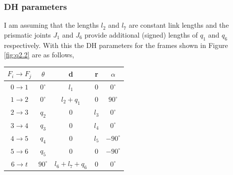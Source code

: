 \documentclass[12pt]{article}
\begin{document}
\subsubsection*{DH parameters}
I am assuming that the lengths $l_2$ and $l_7$ are constant link lengths and the prismatic joints $J_1$ and $J_6$ provide additional (signed) lengths of $q_1$ and $q_6$ respectively.
With this the DH parameters for the frames shown in Figure \ref{fig:q2.2} are as follows,
\begin{center}
\begin{tabular}{ c | c c c c }
 \hline
 $F_i \to F_j$ & $\theta$ & d & r & $\alpha$ \\
 \hline
 $0 \to 1$ & $0^{\circ}$    & $l_1$                      & $0$     &   $0^{\circ}$   \\
 $1 \to 2$ & $0^{\circ}$    & $l_2 + q_1$                & $0$     &   $90^{\circ}$  \\
 $2 \to 3$ & $q_2$          & $0$                        & $l_3$   &   $0^{\circ}$   \\
 $3 \to 4$ & $q_3$          & $0$                        & $l_4$   &   $0^{\circ}$   \\
 $4 \to 5$ & $q_4$          & $0$                        & $l_5$   &   $-90^{\circ}$ \\
 $5 \to 6$ & $q_5$          & $0$                        & $0$     &   $-90^{\circ}$ \\
 $6 \to t$ & $90^{\circ}$   & $l_6 + l_7 + q_6$          & $0$     &   $0^{\circ}$ \\
 \hline
\end{tabular}
\end{center}
\end{document}

